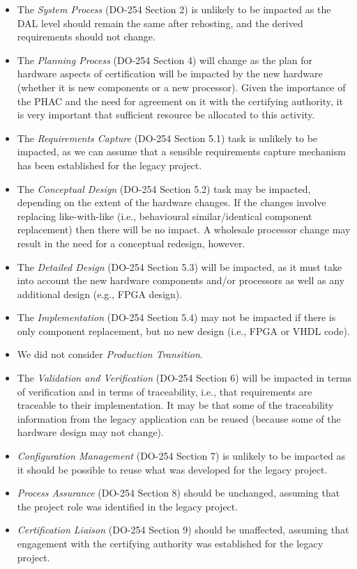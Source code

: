 \documentclass{llncs}
\begin{document}
\begin{itemize}
\item The \textit{System Process} (DO-254 Section 2) is unlikely to be impacted as the DAL level should remain the same after rehosting, and the derived requirements should
not change.

\item The \textit{Planning Process} (DO-254 Section 4) will change as the plan for hardware aspects of certification will be impacted by the new hardware (whether it is new components or a new processor). Given the importance of the PHAC and the need for agreement on it with the certifying authority, it is very important that sufficient resource be allocated to this activity.

\item The \textit{Requirements Capture} (DO-254 Section 5.1) task is unlikely to be impacted, as we can assume that a sensible requirements capture mechanism has been established for the legacy project.

\item The \textit{Conceptual Design} (DO-254 Section 5.2) task may be impacted, depending on the extent of the hardware changes. If the changes involve replacing like-with-like (i.e., behavioural similar/identical component replacement) then there will be no impact. A wholesale processor change may result in the need for a conceptual redesign, however.

\item The \textit{Detailed Design} (DO-254 Section 5.3) will be impacted, as it must take into account the new hardware components and/or processors as well as any additional design (e.g., FPGA design). 

\item The \textit{Implementation} (DO-254 Section 5.4) may not be impacted if there is only component replacement, but no new design (i.e., FPGA or VHDL code).

\item We did not consider \textit{Production Transition}.

\item The \textit{Validation and Verification} (DO-254 Section 6) will be impacted in terms of verification and in terms of traceability, i.e., that requirements are traceable to their implementation. It may be that some of the traceability information from the legacy application can be reused (because some of the hardware design may not change).

\item \textit{Configuration Management} (DO-254 Section 7) is unlikely to be impacted as it should be possible to reuse what was developed for the legacy project.

\item \textit{Process Assurance} (DO-254 Section 8) should be unchanged, assuming that the project role was identified in the legacy project.

\item \textit{Certification Liaison} (DO-254 Section 9) should be unaffected, assuming that engagement with the certifying authority was established for the legacy project.
\end{itemize}
\end{document}
